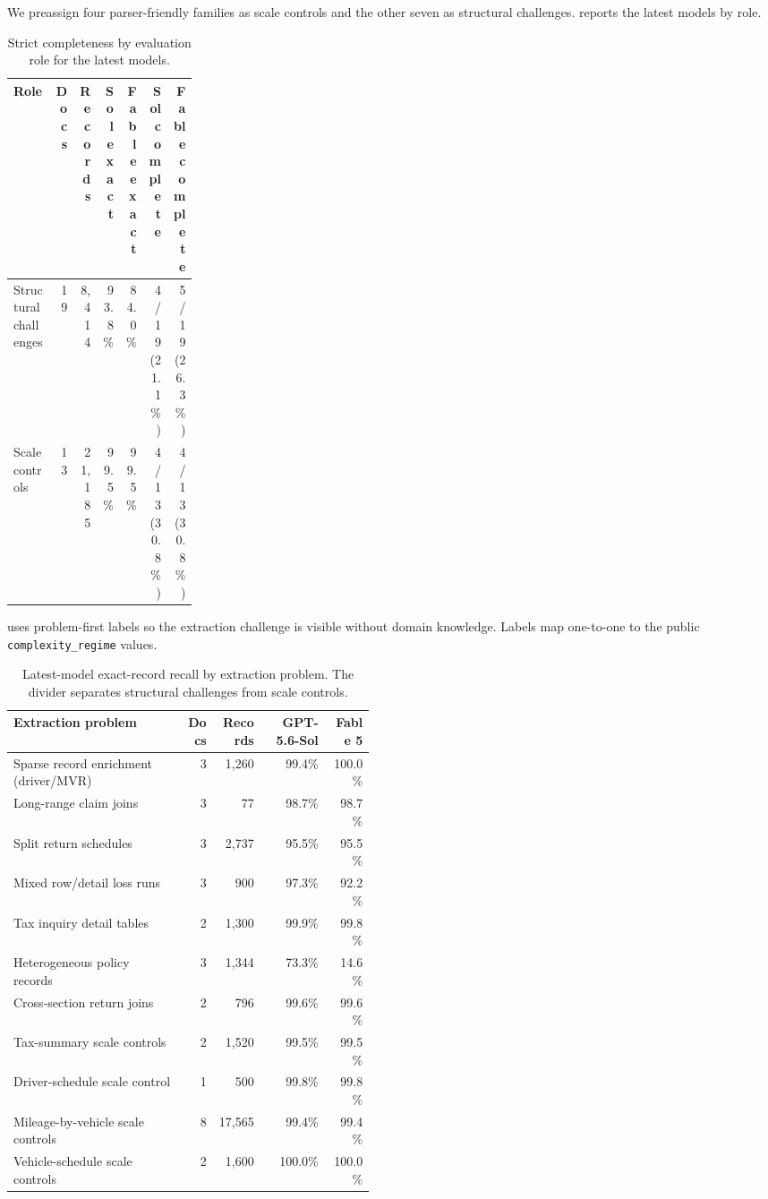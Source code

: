 We preassign four parser-friendly families as scale controls and the other seven as structural challenges.  reports the latest models by role.

\begin{table}[H]
\centering
\scriptsize
\caption{Strict completeness by evaluation role for the latest models.}
\label{tab:agentic-by-role}
\begin{tabular}{@{}p{0.24\linewidth}rrrrrr@{}}
\toprule
Role & Docs & Records & Sol exact & Fable exact & Sol complete & Fable complete \\
\midrule
Structural challenges & 19 & 8{,}414 & 93.8\% & 84.0\% & 4/19 (21.1\%) & 5/19 (26.3\%) \\
Scale controls & 13 & 21{,}185 & 99.5\% & 99.5\% & 4/13 (30.8\%) & 4/13 (30.8\%) \\
\bottomrule
\end{tabular}
\end{table}

 uses problem-first labels so the extraction challenge is visible without domain knowledge. Labels map one-to-one to the public \texttt{complexity\_regime} values.

\begin{table}[H]
\centering
\scriptsize
\caption{Latest-model exact-record recall by extraction problem. The divider separates structural challenges from scale controls.}
\label{tab:agentic-by-regime}
\begin{tabular}{@{}p{0.47\linewidth}rrrr@{}}
\toprule
Extraction problem & Docs & Records & GPT-5.6-Sol & Fable 5 \\
\midrule
Sparse record enrichment (driver/MVR) & 3 & 1{,}260 & 99.4\% & 100.0\% \\
Long-range claim joins & 3 & 77 & 98.7\% & 98.7\% \\
Split return schedules & 3 & 2{,}737 & 95.5\% & 95.5\% \\
Mixed row/detail loss runs & 3 & 900 & 97.3\% & 92.2\% \\
Tax inquiry detail tables & 2 & 1{,}300 & 99.9\% & 99.8\% \\
Heterogeneous policy records & 3 & 1{,}344 & 73.3\% & 14.6\% \\
Cross-section return joins & 2 & 796 & 99.6\% & 99.6\% \\
\midrule
Tax-summary scale controls & 2 & 1{,}520 & 99.5\% & 99.5\% \\
Driver-schedule scale control & 1 & 500 & 99.8\% & 99.8\% \\
Mileage-by-vehicle scale controls & 8 & 17{,}565 & 99.4\% & 99.4\% \\
Vehicle-schedule scale controls & 2 & 1{,}600 & 100.0\% & 100.0\% \\
\bottomrule
\end{tabular}
\end{table}

